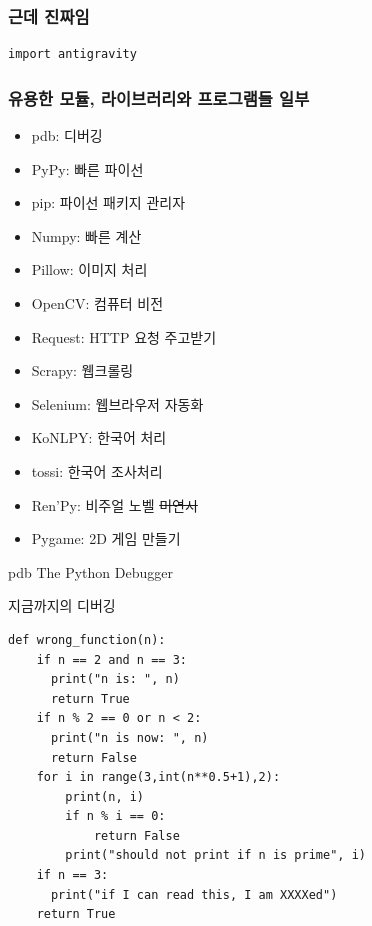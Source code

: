\documentclass{beamer}
\begin{document}
\begin{frame}[fragile]
\frametitle{근데 진짜임}
\begin{lstlisting}
import antigravity
\end{lstlisting}
\end{frame}

\begin{frame}
\frametitle{유용한 모듈, 라이브러리와 프로그램들 일부}
\begin{itemize}
\item pdb: 디버깅\\
\item PyPy: 빠른 파이선\\
\item pip: 파이선 패키지 관리자\\
\item Numpy: 빠른 계산\\
\item Pillow: 이미지 처리\\
\item OpenCV: 컴퓨터 비전\\
\item Request: HTTP 요청 주고받기\\
\item Scrapy: 웹크롤링\\
\item Selenium: 웹브라우저 자동화\\
\item KoNLPY: 한국어 처리\\
\item tossi: 한국어 조사처리\\
\item Ren'Py: 비주얼 노벨 \footnotesize\sout{미연시} \\
\item Pygame: 2D 게임 만들기\\
\end{itemize}
\end{frame}

\begin{frame}{pdb}
  The Python Debugger
\end{frame}

\begin{frame}[fragile]{지금까지의 디버깅}
\begin{lstlisting}
def wrong_function(n):
    if n == 2 and n == 3:
      print("n is: ", n)
      return True
    if n % 2 == 0 or n < 2:
      print("n is now: ", n)
      return False
    for i in range(3,int(n**0.5+1),2):
        print(n, i)
        if n % i == 0:
            return False
        print("should not print if n is prime", i)
    if n == 3:
      print("if I can read this, I am XXXXed")
    return True
\end{lstlisting}
\end{frame}
\end{document}
